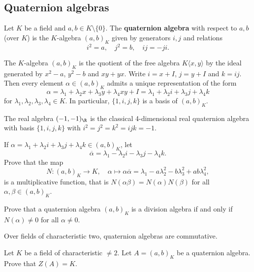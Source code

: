 
\subsection{Quaternion algebras}

\begin{definition}
    Let $K$ be a field and $a,b\in K\setminus\{0\}$. The \textbf{quaternion algebra}
    with respect to $a,b$ (over $K$) is the $K$-algebra
    $(a,b)_K$ given by generators $i,j$ and relations
    \[
    i^2=a,\quad 
    j^2=b,\quad 
    ij=-ji.
    \] 
\end{definition}

The $K$-algebra $(a,b)_K$ is the quotient of the free algebra $K\langle x,y\rangle$ 
by the ideal generated by $x^2-a$, $y^2-b$ and $xy+yx$. Write
$i=x+I$, $j=y+I$ and $k=ij$. Then every element $\alpha\in(a,b)_K$ admits a unique
representation of the form
\[
\alpha=\lambda_1+\lambda_2x+\lambda_3y+\lambda_4xy+I=\lambda_1+\lambda_2i+\lambda_3j+\lambda_4k
\]
for $\lambda_1,\lambda_2,\lambda_3,\lambda_4\in K$. 
In particular, $\{1,i,j,k\}$ is a basis of $(a,b)_K$. 

\begin{example}
The real algebra $(-1,-1)_{\R}$ is the classical 
4-dimensional real 
quaternion algebra with basis $\{1,i,j,k\}$ with 
$i^2=j^2=k^2=ijk=-1$. 
\end{example}

\begin{exercise}
    If $\alpha=\lambda_1+\lambda_2i+\lambda_3j+\lambda_4k\in (a,b)_K$, let 
    \[
    \overline{\alpha}=\lambda_1-\lambda_2i-\lambda_3j-\lambda_4k. 
    \]
    Prove that the map 
    \[
    N\colon (a,b)_K\to K,
    \quad 
    \alpha\mapsto \alpha\overline{\alpha}=\lambda_1-a\lambda_2^2-b\lambda_3^2+ab\lambda_4^2,
    \]
    is a multiplicative function, that is $N(\alpha\beta)=N(\alpha)N(\beta)$ for all $\alpha,\beta\in (a,b)_K$. 
\end{exercise}

\begin{exercise}
    Prove that a quaternion algebra 
    $(a,b)_K$ is a division algebra if and only if $N(\alpha)\ne 0$ for all $\alpha\ne0$. 
\end{exercise}

Over fields of characteristic two, quaternion algebras are commutative. 

\begin{exercise}
    Let $K$ be a field of characteristic $\ne2$. 
    Let $A=(a,b)_K$ be a quaternion algebra. 
    Prove that $Z(A)=K$. 
\end{exercise}

